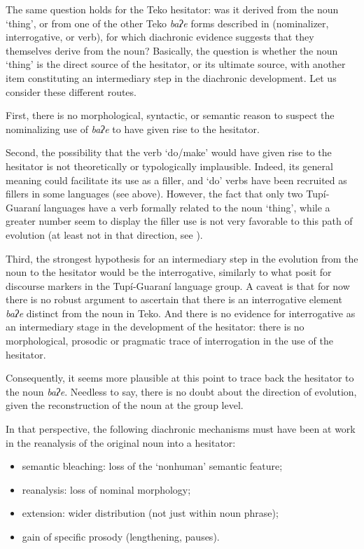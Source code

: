 \documentclass[output=paper]{langscibook}
\begin{document}
The same question holds for the Teko hesitator: was it derived from the noun ‘thing’, or from one of the other Teko \textit{baʔe} forms described in  (nominalizer, interrogative, or verb), for which diachronic evidence suggests that they themselves derive from the noun? Basically, the question is whether the noun ‘thing’ is the direct source of the hesitator, or its ultimate source, with another item constituting an intermediary step in the diachronic development. Let us consider these different routes.

First, there is no morphological, syntactic, or semantic reason to suspect the nominalizing use of \textit{baʔe} to have given rise to the hesitator. 

Second, the possibility that the verb ‘do/make’ would have given rise to the hesitator is not theoretically or typologically implausible. Indeed, its general meaning could facilitate its use as a filler, and ‘do’ verbs have been recruited as fillers in some languages (see above). However, the fact that only two Tupí-Guaraní languages have a verb formally related to the noun ‘thing’, while a greater number seem to display the filler use is not very favorable to this path of evolution (at least not in that direction, see ). 

Third, the strongest hypothesis for an intermediary step in the evolution from the noun to the hesitator would be the interrogative, similarly to what \citet{AuweraAuwera2021} posit for discourse markers in the Tupí-Guaraní language group. A caveat is that for now there is no robust argument to ascertain that there is an interrogative element \textit{baʔe} distinct from the noun in Teko. And there is no evidence for interrogative as an intermediary stage in the development of the hesitator: there is no morphological, prosodic or pragmatic trace of interrogation in the use of the hesitator.

Consequently, it seems more plausible at this point to trace back the hesitator to the noun \textit{baʔe}. Needless to say, there is no doubt about the direction of evolution, given the reconstruction of the noun at the group level. 

In that perspective, the following diachronic mechanisms must have been at work in the reanalysis of the original noun into a hesitator:

\begin{itemize}
\item semantic bleaching: loss of the ‘nonhuman’ semantic feature;  
\item reanalysis: loss of nominal morphology;
\item extension: wider distribution (not just within noun phrase);
\item gain of specific prosody (lengthening, pauses).
\end{itemize}
\end{document}
